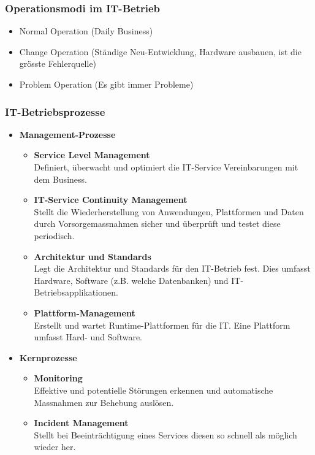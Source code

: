 \subsubsection{Operationsmodi im IT-Betrieb}
\begin{itemize}
	\item Normal Operation (Daily Business)
	\item Change Operation (Ständige Neu-Entwicklung, Hardware ausbauen, ist die grösste Fehlerquelle)
	\item Problem Operation (Es gibt immer Probleme)
\end{itemize}

\subsubsection{IT-Betriebsprozesse}
\begin{itemize}
	\item \textbf{Management-Prozesse}
	\begin{itemize}
		\item \textbf{Service Level Management}\\
			Definiert, überwacht und optimiert die IT-Service Vereinbarungen mit dem Business.
		\item \textbf{IT-Service Continuity Management} \\
			Stellt die Wiederherstellung von Anwendungen, Plattformen und Daten durch Vorsorgemassnahmen sicher und überprüft und testet diese periodisch.
		\item \textbf{Architektur und Standards} \\
			Legt die Architektur und Standards für den IT-Betrieb fest. Dies umfasst Hardware, Software (z.B. welche Datenbanken) und IT-Betriebsapplikationen.
		\item \textbf{Plattform-Management} \\
			Erstellt und wartet Runtime-Plattformen für die IT. Eine Plattform umfasst Hard- und Software.
	\end{itemize}
	\item \textbf{Kernprozesse}
	\begin{itemize}
		\item \textbf{Monitoring}\\
			Effektive und potentielle Störungen erkennen und automatische Massnahmen zur Behebung auslösen.
		\item \textbf{Incident Management} \\
			Stellt bei Beeinträchtigung eines Services diesen so schnell als möglich wieder her.

\end{itemize}
\end{itemize}

